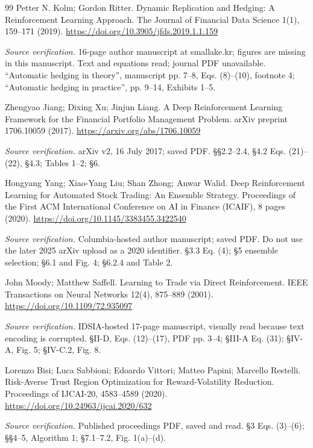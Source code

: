 \documentclass[11pt,a4paper]{article}
\theoremstyle{plain}
\theoremstyle{definition}
\theoremstyle{remark}
\begin{document}
\begin{thebibliography}{99}
\small
{} Petter N. Kolm; Gordon Ritter. Dynamic Replication and Hedging: A Reinforcement Learning Approach. The Journal of Financial Data Science 1(1), 159--171 (2019). \url{https://doi.org/10.3905/jfds.2019.1.1.159}
\par\smallskip\noindent\emph{Source verification.} 16-page author manuscript at smallake.kr; figures are missing in this manuscript. Text and equations read; journal PDF unavailable. ``Automatic hedging in theory'', manuscript pp. 7--8, Eqs. (8)--(10), footnote 4; ``Automatic hedging in practice'', pp. 9--14, Exhibits 1--5.

 Zhengyao Jiang; Dixing Xu; Jinjun Liang. A Deep Reinforcement Learning Framework for the Financial Portfolio Management Problem. arXiv preprint 1706.10059 (2017). \url{https://arxiv.org/abs/1706.10059}
\par\smallskip\noindent\emph{Source verification.} arXiv v2, 16 July 2017; saved PDF. \S{}\S{}2.2--2.4, \S{}4.2 Eqs. (21)--(22), \S{}4.3; Tables 1--2; \S{}6.

 Hongyang Yang; Xiao-Yang Liu; Shan Zhong; Anwar Walid. Deep Reinforcement Learning for Automated Stock Trading: An Ensemble Strategy. Proceedings of the First ACM International Conference on AI in Finance (ICAIF), 8 pages (2020). \url{https://doi.org/10.1145/3383455.3422540}
\par\smallskip\noindent\emph{Source verification.} Columbia-hosted author manuscript; saved PDF. Do not use the later 2025 arXiv upload as a 2020 identifier. \S{}3.3 Eq. (4); \S{}5 ensemble selection; \S{}6.1 and Fig. 4; \S{}6.2.4 and Table 2.

 John Moody; Matthew Saffell. Learning to Trade via Direct Reinforcement. IEEE Transactions on Neural Networks 12(4), 875--889 (2001). \url{https://doi.org/10.1109/72.935097}
\par\smallskip\noindent\emph{Source verification.} IDSIA-hosted 17-page manuscript, visually read because text encoding is corrupted. \S{}II-D, Eqs. (12)--(17), PDF pp. 3--4; \S{}III-A Eq. (31); \S{}IV-A, Fig. 5; \S{}IV-C.2, Fig. 8.

 Lorenzo Bisi; Luca Sabbioni; Edoardo Vittori; Matteo Papini; Marcello Restelli. Risk-Averse Trust Region Optimization for Reward-Volatility Reduction. Proceedings of IJCAI-20, 4583--4589 (2020). \url{https://doi.org/10.24963/ijcai.2020/632}
\par\smallskip\noindent\emph{Source verification.} Published proceedings PDF, saved and read. \S{}3 Eqs. (3)--(6); \S{}\S{}4--5, Algorithm 1; \S{}7.1--7.2, Fig. 1(a)--(d).


\end{thebibliography}
\end{document}
